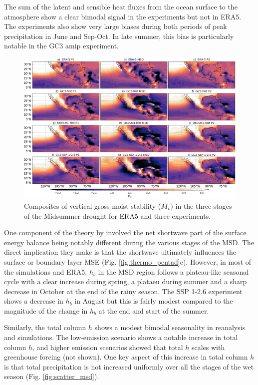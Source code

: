  The sum of the latent and sensible heat fluxes from the ocean surface to the atmosphere show a clear bimodal signal in the experiments but not in ERA5. The experiments also show very large biases during both periods of peak precipitation in June and Sep-Oct. In late summer, this bias is particularly notable in the GC3 amip experiment. 
 
\begin{figure}[t!]
\includegraphics[width=\linewidth]{figures/thermocompositeMv.png}
\caption[Composites of gross moist stability]{Composites of vertical gross moist stability ($M_v$) in the three stages of the Midsummer drought for ERA5 and three experiments.  }
\label{fig:Mvcompo}
\end{figure} 
 
One component of the theory by \cite{karnauskas2013} involved the net shortwave part of the surface energy balance being notably different during the various stages of the MSD. The direct implication they make is that the shortwave ultimately influences the surface or boundary layer MSE (Fig. \ref{fig:thermo_pentad}e). However, in most of the simulations and ERA5, $h_b$ in the MSD region follows a plateau-like seasonal cycle with a clear increase during spring, a plataeu during summer and a sharp decrease in October at the end of the rainy season. The SSP 1-2.6 experiment shows a  decrease in $h_b$ in August but this is fairly modest compared to the magnitude of the change in $h_b$ at the end and start of the summer. 

Similarly, the total column $h$ shows a modest bimodal seasonality in reanalysis and simulations. 
The low-emission scenario shows a notable increase in total column $h$, and higher emission scenarios showed that total $h$ scales with greenhouse forcing (not shown). One key aspect of this increase in total column $h$ is that total precipitation is not increased uniformly over all the stages of the wet season (Fig. \ref{fig:scatter_msd}). 

